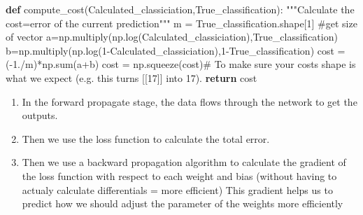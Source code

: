 \documentclass[
  letterpaper,
  DIV=11,
  numbers=noendperiod]{scrartcl}
\newenvironment{Shaded}{\begin{snugshade}}{\end{snugshade}}
\newcommand{\BuiltInTok}[1]{\textcolor[rgb]{0.00,0.23,0.31}{#1}}
\newcommand{\CommentTok}[1]{\textcolor[rgb]{0.37,0.37,0.37}{#1}}
\newcommand{\ControlFlowTok}[1]{\textcolor[rgb]{0.00,0.23,0.31}{\textbf{#1}}}
\newcommand{\DecValTok}[1]{\textcolor[rgb]{0.68,0.00,0.00}{#1}}
\newcommand{\FloatTok}[1]{\textcolor[rgb]{0.68,0.00,0.00}{#1}}
\newcommand{\KeywordTok}[1]{\textcolor[rgb]{0.00,0.23,0.31}{\textbf{#1}}}
\newcommand{\NormalTok}[1]{\textcolor[rgb]{0.00,0.23,0.31}{#1}}
\newcommand{\OperatorTok}[1]{\textcolor[rgb]{0.37,0.37,0.37}{#1}}
\providecommand{\tightlist}{%
  \setlength{\itemsep}{0pt}\setlength{\parskip}{0pt}}\usepackage{longtable,booktabs,array}
\begin{document}
\begin{Shaded}
\begin{Highlighting}[]
\KeywordTok{def}\NormalTok{ compute\_cost(Calculated\_classiciation,True\_classification):}
    \CommentTok{"""Calculate the cost=error of the current prediction"""}
\NormalTok{    m }\OperatorTok{=}\NormalTok{ True\_classification.shape[}\DecValTok{1}\NormalTok{] }\CommentTok{\#get size of vector}
\NormalTok{    a}\OperatorTok{=}\NormalTok{np.multiply(np.log(Calculated\_classiciation),True\_classification)}
\NormalTok{    b}\OperatorTok{=}\NormalTok{np.multiply(np.log(}\DecValTok{1}\OperatorTok{{-}}\NormalTok{Calculated\_classiciation),}\DecValTok{1}\OperatorTok{{-}}\NormalTok{True\_classification)}
\NormalTok{    cost }\OperatorTok{=}\NormalTok{  (}\OperatorTok{{-}}\FloatTok{1.}\OperatorTok{/}\NormalTok{m)}\OperatorTok{*}\NormalTok{np.}\BuiltInTok{sum}\NormalTok{(a}\OperatorTok{+}\NormalTok{b)}
\NormalTok{    cost }\OperatorTok{=}\NormalTok{ np.squeeze(cost)}\CommentTok{\# To make sure your cost\textquotesingle{}s shape is what we expect (e.g. this turns [[17]] into 17).}
    \ControlFlowTok{return}\NormalTok{ cost}
\end{Highlighting}
\end{Shaded}

\begin{enumerate}
\def\labelenumi{\arabic{enumi}.}
\tightlist
\item
  In the forward propagate stage, the data flows through the network to
  get the outputs.
\item
  Then we use the loss function to calculate the total error.
\item
  Then we use a backward propagation algorithm to calculate the gradient
  of the loss function with respect to each weight and bias (without
  having to actualy calculate differentials = more efficient) This
  gradient helps us to predict how we should adjust the parameter of the
  weights more efficiently
\end{enumerate}
\end{document}
